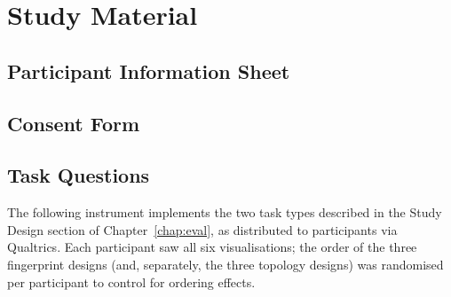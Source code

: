 \documentclass[logo,msc]{infthesis}
\begin{document}
 
\appendix
 
\chapter{Study Material}
 
\section{Participant Information Sheet}


\section{Consent Form}

 
\section{Task Questions}
\label{app:questionnaire}

The following instrument implements the two task types described in the Study Design section of Chapter~\ref{chap:eval}, as distributed to participants via Qualtrics. Each participant saw all six visualisations; the order of the three fingerprint designs (and, separately, the three topology designs) was randomised per participant to control for ordering effects.
\end{document}
